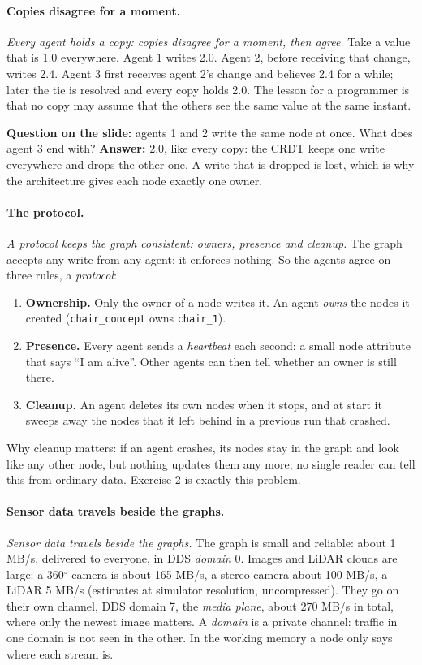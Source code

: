 \documentclass[11pt]{article}
\newcommand{\slt}[1]{\emph{#1}}   %
\begin{document}
\paragraph{Copies disagree for a moment.} \slt{Every agent holds a copy: copies disagree for a moment, then agree.} Take a value that is 1.0 everywhere. Agent 1 writes 2.0. Agent 2, before receiving that change, writes 2.4. Agent 3 first receives agent 2's change and believes 2.4 for a while; later the tie is resolved and every copy holds 2.0. The lesson for a programmer is that no copy may assume that the others see the same value at the same instant.

\textbf{Question on the slide:} agents 1 and 2 write the same node at once. What does agent 3 end with? \textbf{Answer:} 2.0, like every copy: the CRDT keeps one write everywhere and drops the other one. A write that is dropped is lost, which is why the architecture gives each node exactly one owner.

\paragraph{The protocol.} \slt{A protocol keeps the graph consistent: owners, presence and cleanup.} The graph accepts any write from any agent; it enforces nothing. So the agents agree on three rules, a \emph{protocol}:
\begin{enumerate}
\item \textbf{Ownership.} Only the owner of a node writes it. An agent \emph{owns} the nodes it created (\texttt{chair\_concept} owns \texttt{chair\_1}).
\item \textbf{Presence.} Every agent sends a \emph{heartbeat} each second: a small node attribute that says ``I am alive''. Other agents can then tell whether an owner is still there.
\item \textbf{Cleanup.} An agent deletes its own nodes when it stops, and at start it sweeps away the nodes that it left behind in a previous run that crashed.
\end{enumerate}
Why cleanup matters: if an agent crashes, its nodes stay in the graph and look like any other node, but nothing updates them any more; no single reader can tell this from ordinary data. Exercise 2 is exactly this problem.

\paragraph{Sensor data travels beside the graphs.} \slt{Sensor data travels beside the graphs.} The graph is small and reliable: about 1 MB/s, delivered to everyone, in DDS \emph{domain} 0. Images and LiDAR clouds are large: a 360$^\circ$ camera is about 165 MB/s, a stereo camera about 100 MB/s, a LiDAR 5 MB/s (estimates at simulator resolution, uncompressed). They go on their own channel, DDS domain 7, the \emph{media plane}, about 270 MB/s in total, where only the newest image matters. A \emph{domain} is a private channel: traffic in one domain is not seen in the other. In the working memory a node only says where each stream is.
\end{document}
